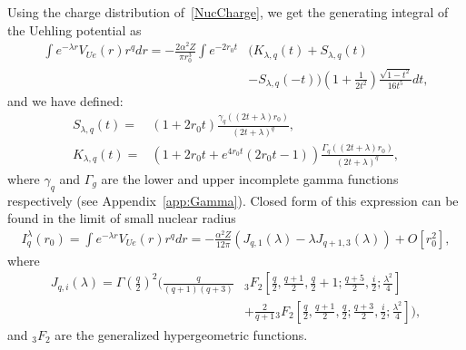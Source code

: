 Using the charge distribution of~\eqref{NucCharge}, we get the generating integral of the Uehling potential as
\begin{align}
\int e^{-\lambda r}V_{Ue}(r) r^q dr =-\frac{2\alpha^2 Z}{\pi r_0^3}\int e^{-2r_0t}&\big(K_{\lambda,q}(t)+S_{\lambda,q}(t) \nonumber
\\
&-S_{\lambda,q}(-t)\big)\left(1+\frac{1}{2t^2}\right)\frac{\sqrt{1-t^2}}{16 t^5} dt,
\end{align}
and we have defined:
\begin{align}
 S_{\lambda,q}(t) =& (1+2r_0t)\frac{\gamma_q((2t+\lambda)r_0)}{(2t+\lambda)^{q}}, \\ K_{\lambda,q}(t)=&(1+2r_0t+e^{4r_0t}(2r_0t-1))\frac{\Gamma_q((2t+\lambda)r_0)}{(2t+\lambda)^{q}},
\end{align}
where $\gamma_q$ and $\Gamma_g$ are the lower and upper incomplete gamma functions respectively (see Appendix~\ref{app:Gamma}). Closed form of this expression can be found in the limit of small nuclear radius
\begin{align}
I_q^\lambda (r_0) =\int e^{-\lambda r}V_{Ue}(r) r^q dr = -\frac{\alpha^2 Z}{12\pi}(J_{q,1}(\lambda)-\lambda J_{q+1,3}(\lambda)) + O[r_0^2],
\end{align}
where
\begin{align}
J_{q,i}(\lambda) = \Gamma \left(\frac{q}{2}\right)^2\Bigg(\frac{q}{(q+1)(q+3)}&
	{_3F_2}\left[\frac{q}{2},\frac{q+1}{2},\frac{q}{2}+1;\frac{q+5}{2},\frac{i}{2};\frac{\lambda^2}{4}\right] \nonumber
	\\
	&+\frac{2}{q+1}{_3F_2}\left[\frac{q}{2},\frac{q+1}{2},\frac{q}{2};\frac{q+3}{2},\frac{i}{2};\frac{\lambda^2}{4}\right]\Bigg),
\end{align}
and ${}_3F_2$ are the generalized hypergeometric functions.

